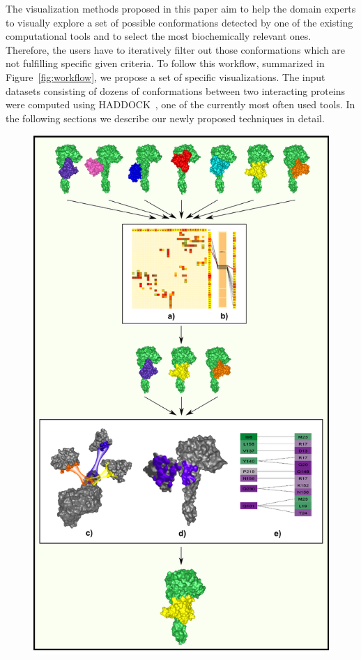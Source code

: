 \documentclass[journal]{vgtc}                %
\begin{document}
The visualization methods proposed in this paper aim to help the domain experts to visually explore a set of possible conformations detected by one of the existing computational tools and to select the most biochemically relevant ones.
Therefore, the users have to iteratively filter out those conformations which are not fulfilling specific given criteria.
To follow this workflow, summarized in Figure~\ref{fig:workflow}, we propose a set of specific visualizations. 
The input datasets consisting of dozens of conformations between two interacting proteins were computed using HADDOCK~\cite{haddock}, one of the currently most often used tools.
In the following sections we describe our newly proposed techniques in detail.

\begin{figure}[htb]
  \centering
  \includegraphics[width=0.98\columnwidth]{workflow.png}

\end{figure}
\end{document}
